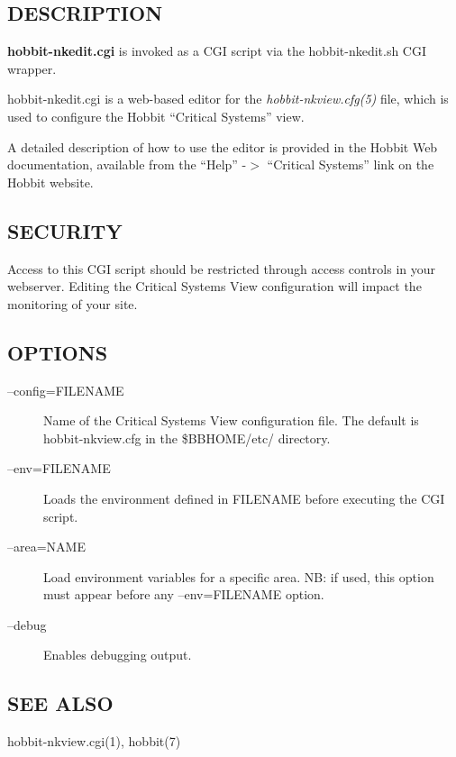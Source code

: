 \subsection{DESCRIPTION}
\textbf{hobbit-nkedit.cgi} is invoked as a CGI script via the hobbit-nkedit.sh CGI wrapper. 

  hobbit-nkedit.cgi is a web-based editor for the
  \emph{hobbit-nkview.cfg(5)} file, which is used to configure the
  Hobbit ``Critical Systems'' view. 


  A detailed description of how to use the editor is provided in the
  Hobbit Web documentation, available from the ``Help'' -$>$
  ``Critical Systems'' link on the Hobbit website. 



\subsection{SECURITY}
 Access to this CGI script should be restricted through access
 controls in your webserver. Editing the Critical Systems View
 configuration will impact the monitoring of your site. 


\subsection{OPTIONS}
\begin{description}
\item[--config=FILENAME] Name of the Critical Systems View
  configuration file. The default is hobbit-nkview.cfg in the
  \$BBHOME/etc/ directory. 


 

\item[--env=FILENAME] Loads the environment defined in FILENAME before executing the CGI script. 

 

\item[--area=NAME] Load environment variables for a specific area. NB:
  if used, this option must appear before any --env=FILENAME option. 


 

\item[--debug] Enables debugging output. 

 


\end{description}
\subsection{SEE ALSO}
hobbit-nkview.cgi(1), hobbit(7) 


